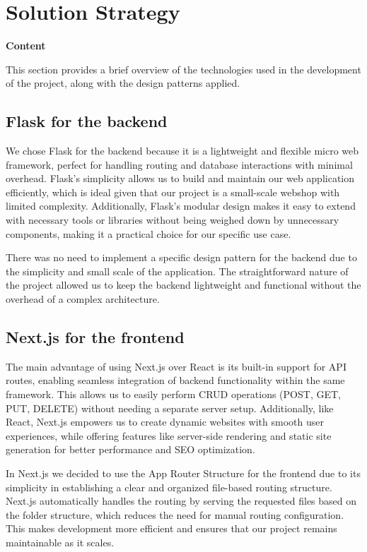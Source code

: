 \hypertarget{section-solution-strategy}{%
\section{Solution Strategy}\label{section-solution-strategy}}

\textbf{Content}

This section provides a brief overview of the technologies used in the development of the project, along with the design patterns applied.

\subsection{Flask for the backend}
We chose Flask for the backend because it is a lightweight and flexible micro web framework, perfect for handling routing and database interactions with minimal overhead. Flask’s simplicity allows us to build and maintain our web application efficiently, which is ideal given that our project is a small-scale webshop with limited complexity. Additionally, Flask’s modular design makes it easy to extend with necessary tools or libraries without being weighed down by unnecessary components, making it a practical choice for our specific use case.

There was no need to implement a specific design pattern for the backend due to the simplicity and small scale of the application. The straightforward nature of the project allowed us to keep the backend lightweight and functional without the overhead of a complex architecture.

\subsection{Next.js for the frontend}
The main advantage of using Next.js over React is its built-in support for API routes, enabling seamless integration of backend functionality within the same framework. This allows us to easily perform CRUD operations (POST, GET, PUT, DELETE) without needing a separate server setup. Additionally, like React, Next.js empowers us to create dynamic websites with smooth user experiences, while offering features like server-side rendering and static site generation for better performance and SEO optimization.

In Next.js we decided to use the App Router Structure for the frontend due to its simplicity in establishing a clear and organized file-based routing structure. Next.js automatically handles the routing by serving the requested files based on the folder structure, which reduces the need for manual routing configuration. This makes development more efficient and ensures that our project remains maintainable as it scales.